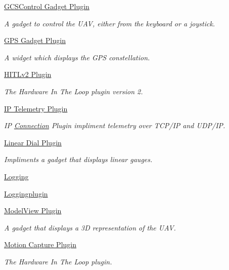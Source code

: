 \begin{DoxyCompactItemize}
\hyperlink{group___g_c_s_control_gadget_plugin}{G\-C\-S\-Control Gadget Plugin}
\begin{DoxyCompactList}\small\item\em A gadget to control the U\-A\-V, either from the keyboard or a joystick. \end{DoxyCompactList}\item 
\hyperlink{group___g_p_s_gadget_plugin}{G\-P\-S Gadget Plugin}
\begin{DoxyCompactList}\small\item\em A widget which displays the G\-P\-S constellation. \end{DoxyCompactList}\item 
\hyperlink{group___h_i_t_l_plugin}{H\-I\-T\-Lv2 Plugin}
\begin{DoxyCompactList}\small\item\em The Hardware In The Loop plugin version 2. \end{DoxyCompactList}\item 
\hyperlink{group___i_p_conn_plugin}{I\-P Telemetry Plugin}
\begin{DoxyCompactList}\small\item\em I\-P \hyperlink{struct_connection}{Connection} Plugin impliment telemetry over T\-C\-P/\-I\-P and U\-D\-P/\-I\-P. \end{DoxyCompactList}\item 
\hyperlink{group___linear_dial_plugin}{Linear Dial Plugin}
\begin{DoxyCompactList}\small\item\em Impliments a gadget that displays linear gauges. \end{DoxyCompactList}\item 
\hyperlink{group___logging}{Logging}
\item 
\hyperlink{group__loggingplugin}{Loggingplugin}
\item 
\hyperlink{group___model_view_plugin}{Model\-View Plugin}
\begin{DoxyCompactList}\small\item\em A gadget that displays a 3\-D representation of the U\-A\-V. \end{DoxyCompactList}\item 
\hyperlink{group___mo_cap_plugin}{Motion Capture Plugin}
\begin{DoxyCompactList}\small\item\em The Hardware In The Loop plugin. \end{DoxyCompactList}\item 

\end{DoxyCompactItemize}

